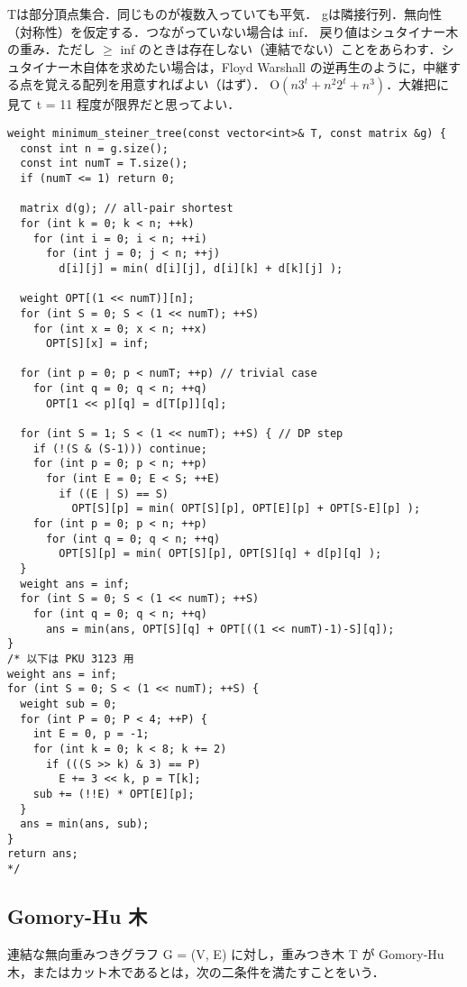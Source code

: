 Tは部分頂点集合．同じものが複数入っていても平気．
gは隣接行列．無向性（対称性）を仮定する．つながっていない場合は inf．
戻り値はシュタイナー木の重み．ただし $\geq$ inf のときは存在しない（連結でない）ことをあらわす．シュタイナー木自体を求めたい場合は，Floyd Warshall の逆再生のように，中継する点を覚える配列を用意すればよい（はず）． $\mathrm{O}(n 3^t + n^2 2^t + n^3)$．大雑把に見て t = 11 程度が限界だと思ってよい．

\begin{lstlisting}
weight minimum_steiner_tree(const vector<int>& T, const matrix &g) {
  const int n = g.size();
  const int numT = T.size();
  if (numT <= 1) return 0;

  matrix d(g); // all-pair shortest
  for (int k = 0; k < n; ++k)
    for (int i = 0; i < n; ++i)
      for (int j = 0; j < n; ++j)
        d[i][j] = min( d[i][j], d[i][k] + d[k][j] );

  weight OPT[(1 << numT)][n];
  for (int S = 0; S < (1 << numT); ++S)
    for (int x = 0; x < n; ++x)
      OPT[S][x] = inf;

  for (int p = 0; p < numT; ++p) // trivial case
    for (int q = 0; q < n; ++q)
      OPT[1 << p][q] = d[T[p]][q];

  for (int S = 1; S < (1 << numT); ++S) { // DP step
    if (!(S & (S-1))) continue;
    for (int p = 0; p < n; ++p)
      for (int E = 0; E < S; ++E)
        if ((E | S) == S)
          OPT[S][p] = min( OPT[S][p], OPT[E][p] + OPT[S-E][p] );
    for (int p = 0; p < n; ++p)
      for (int q = 0; q < n; ++q)
        OPT[S][p] = min( OPT[S][p], OPT[S][q] + d[p][q] );
  }
  weight ans = inf;
  for (int S = 0; S < (1 << numT); ++S)
    for (int q = 0; q < n; ++q)
      ans = min(ans, OPT[S][q] + OPT[((1 << numT)-1)-S][q]);
}
/* 以下は PKU 3123 用
weight ans = inf;
for (int S = 0; S < (1 << numT); ++S) {
  weight sub = 0;
  for (int P = 0; P < 4; ++P) {
    int E = 0, p = -1;
    for (int k = 0; k < 8; k += 2) 
      if (((S >> k) & 3) == P)
        E += 3 << k, p = T[k];
    sub += (!!E) * OPT[E][p];
  }
  ans = min(ans, sub);
}
return ans;
*/
\end{lstlisting}




\subsection{Gomory-Hu 木}

連結な無向重みつきグラフ G = (V, E) に対し，重みつき木 T が Gomory-Hu 木，またはカット木であるとは，次の二条件を満たすことをいう．

